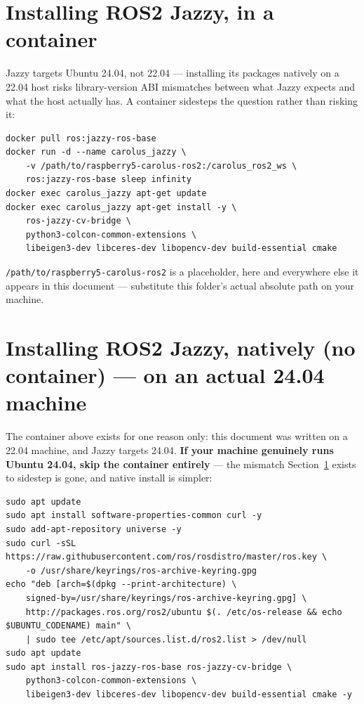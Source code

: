 \documentclass[11pt]{report}
\begin{document}
\section{Installing ROS2 Jazzy, in a container}
\label{sec:ros2-jazzy-container}

Jazzy targets Ubuntu 24.04, not 22.04 --- installing its packages natively on
a 22.04 host risks library-version ABI mismatches between what Jazzy expects
and what the host actually has. A container sidesteps the question rather
than risking it:

\begin{lstlisting}[style=shell]
docker pull ros:jazzy-ros-base
docker run -d --name carolus_jazzy \
    -v /path/to/raspberry5-carolus-ros2:/carolus_ros2_ws \
    ros:jazzy-ros-base sleep infinity
docker exec carolus_jazzy apt-get update
docker exec carolus_jazzy apt-get install -y \
    ros-jazzy-cv-bridge \
    python3-colcon-common-extensions \
    libeigen3-dev libceres-dev libopencv-dev build-essential cmake
\end{lstlisting}

\texttt{/path/to/raspberry5-carolus-ros2} is a placeholder, here and
everywhere else it appears in this document --- substitute this folder's
actual absolute path on your machine.

\section{Installing ROS2 Jazzy, natively (no container) --- on an actual 24.04 machine}
\label{sec:ros2-jazzy-native-pc}

The container above exists for one reason only: this document was written
on a 22.04 machine, and Jazzy targets 24.04. \textbf{If your machine
genuinely runs Ubuntu 24.04, skip the container entirely} --- the
mismatch Section~\ref{sec:ros2-jazzy-container} exists to sidestep is gone,
and native install is simpler:

\begin{lstlisting}[style=shell]
sudo apt update
sudo apt install software-properties-common curl -y
sudo add-apt-repository universe -y
sudo curl -sSL https://raw.githubusercontent.com/ros/rosdistro/master/ros.key \
    -o /usr/share/keyrings/ros-archive-keyring.gpg
echo "deb [arch=$(dpkg --print-architecture) \
    signed-by=/usr/share/keyrings/ros-archive-keyring.gpg] \
    http://packages.ros.org/ros2/ubuntu $(. /etc/os-release && echo $UBUNTU_CODENAME) main" \
    | sudo tee /etc/apt/sources.list.d/ros2.list > /dev/null
sudo apt update
sudo apt install ros-jazzy-ros-base ros-jazzy-cv-bridge \
    python3-colcon-common-extensions \
    libeigen3-dev libceres-dev libopencv-dev build-essential cmake -y
\end{lstlisting}
\end{document}
